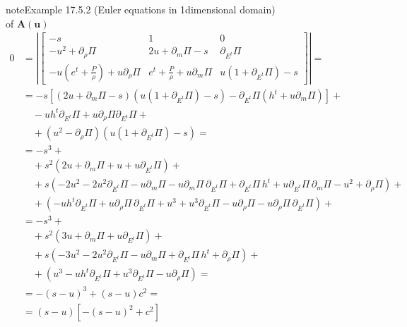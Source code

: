 \documentclass[letterpaper,10pt,english]{jupyterBook}
\begin{document}
\begin{sphinxadmonition}{note}{Example 17.5.2 (Euler equations in 1\sphinxhyphen{}dimensional domain)}
\begin{equation*}
\end{equation*}
\sphinxAtStartPar
{} of \(\mathbf{A}(\mathbf{u})\)
\begin{equation*}
\begin{split}
  0
  & = \left| \begin{bmatrix} -s & 1 & 0 \\ 
   -u^2 + \partial_\rho \Pi & 2 u + \partial_m \Pi - s & \partial_{E^t} \Pi \\
   - u \left(e^t+\frac{P}{\rho} \right)+ u \partial_\rho \Pi & e^t + \frac{P}{\rho} + u \partial_{m} \Pi & u \left( 1 + \partial_{E^t} \Pi \right) - s
  \end{bmatrix} \right| = \\
  & = - s \left[ \left( 2 u + \partial_m \Pi - s  \right) \left( u \left( 1 + \partial_{E^t} \Pi \right) - s \right) - \partial_{E^t} \Pi \left( h^t + u \partial_m \Pi \right) \right] + \\
  & \quad - u h^t \partial_{E^t} \Pi + u \partial_\rho \Pi \partial_{E^t} \Pi + \\
  & \quad + (u^2 - \partial_\rho \Pi) \left( u (1 + \partial_{E^t} \Pi) - s \right) = \\
  & = -s^3 + \\
  & \quad + s^2 \left( 2 u + \partial_m \Pi + u + u \partial_{E^t} \Pi  \right) + \\
  & \quad + s   \left( - 2 u^2 - 2u^2 \partial_{E^t} \Pi - u \partial_m \Pi - u \partial_m \Pi \, \partial_{E^t} \Pi + \partial_{E^t} \Pi \, h^t + u \partial_{E^t} \Pi \, \partial_m \Pi - u^2 + \partial_{\rho} \Pi  \right) + \\
  & \quad +     \left( -u h^t \partial_{E^t} \Pi + u \partial_{\rho} \Pi \, \partial_{E^t} \Pi + u^3 + u^3 \partial_{E^t} \Pi - u \partial_{\rho} \Pi - u \partial_{\rho} \Pi \, \partial_{E^t} \Pi \right) + \\
  & = -s^3 + \\
  & \quad + s^2 \left( 3 u + \partial_m \Pi + u \partial_{E^t} \Pi  \right) + \\
  & \quad + s   \left( - 3 u^2 - 2u^2 \partial_{E^t} \Pi - u \partial_m \Pi + \partial_{E^t} \Pi \, h^t + \partial_{\rho} \Pi  \right) + \\
  & \quad +     \left( u^3 - u h^t \partial_{E^t} \Pi + u^3 \partial_{E^t} \Pi - u \partial_{\rho} \Pi \right) = \\
  & = - (s - u)^3 + ( s - u ) c^2 = \\
  & = ( s - u ) \left[ -(s-u)^2 + c^2 \right]
\end{split}

\end{equation*}
\end{sphinxadmonition}
\end{document}
